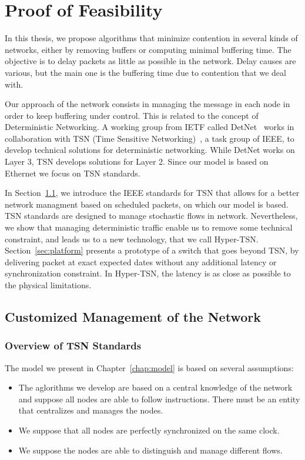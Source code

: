 
\chapter{Proof of Feasibility}
\label{chap:TSN}
\minitoc

In this thesis, we propose algorithms that minimize contention in several kinds of networks, either by removing buffers or computing minimal buffering time. The objective is to delay packets as little as possible in the network. Delay causes are various, but the main one is the buffering time due to contention that we deal with. 

Our approach of the network consists in managing the message in each node in order to keep buffering under control. This is related to the concept of Deterministic Networking. A working group from IETF called DetNet~\cite{finn-detnet-architecture-08} works in collaboration with TSN (Time Sensitive Networking)~\cite{ieee802}, a task group of IEEE, to develop technical solutions for deterministic networking. While DetNet works on Layer 3, TSN develops solutions for Layer 2. Since our model is based on Ethernet we focus on TSN standards.

In Section~\ref{sec:TSNqbv}, we introduce the IEEE standards for TSN that allows for a better network managment based on scheduled packets, on which our model is based. TSN standards are designed to manage stochastic flows in network. Nevertheless, we show that managing deterministic traffic enable us to remove some technical constraint, and leads us to a new technology, that we call Hyper-TSN. Section~\ref{sec:platform} presents a prototype of a switch that goes beyond TSN, by delivering packet at exact expected dates without any additional latency or synchronization constraint. In Hyper-TSN, the latency is as close as possible to the physical limitations.


\section{Customized Management of the Network}
\label{sec:TSNqbv}

\subsection{Overview of TSN Standards}

The model we present in Chapter~\ref{chap:model} is based on several assumptions:
\begin{itemize}
\item The aglorithms we develop are based on a central knowledge of the network and suppose all nodes are able to follow instructions. There must be an entity that centralizes and manages the nodes.
\item We suppose that all nodes are perfectly synchronized on the same clock.
\item We suppose the nodes are able to distinguish and manage different flows.
\end{itemize}

